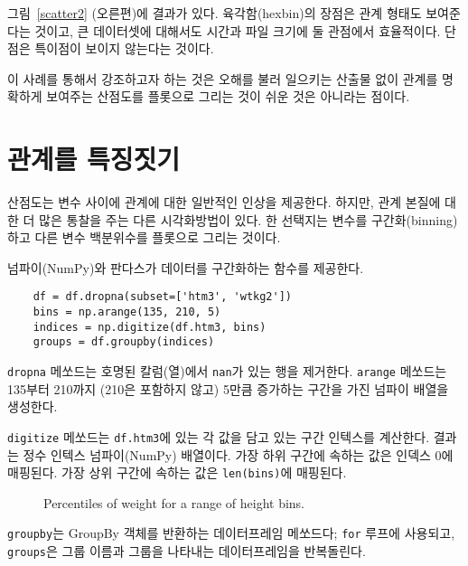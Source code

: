 그림~\ref{scatter2} (오른편)에 결과가 있다.
육각함(hexbin)의 장점은 관계 형태도 보여준다는 것이고,
큰 데이터셋에 대해서도 시간과 파일 크기에 둘 관점에서 효율적이다.
단점은 특이점이 보이지 않는다는 것이다.
 

이 사례를 통해서 강조하고자 하는 것은 오해를 불러 일으키는 산출물 없이 관계를 명확하게 보여주는 산점도를 플롯으로 그리는 것이 쉬운 것은 아니라는 점이다.



\section{관계를 특징짓기}
\label{characterizing}

산점도는 변수 사이에 관계에 대한 일반적인 인상을 제공한다. 하지만, 관계 본질에 대한 더 많은 통찰을 주는 
다른 시각화방법이 있다. 한 선택지는 변수를 구간화(binning)하고 다른 변수 백분위수를 플롯으로 그리는 것이다.


넘파이(NumPy)와 판다스가 데이터를 구간화하는 함수를 제공한다.

\begin{verbatim}
    df = df.dropna(subset=['htm3', 'wtkg2'])
    bins = np.arange(135, 210, 5)
    indices = np.digitize(df.htm3, bins)
    groups = df.groupby(indices)
\end{verbatim}

{\tt dropna} 메쏘드는 호명된 칼럼(열)에서 {\tt nan}가 있는 행을 제거한다. 
{\tt arange} 메쏘드는 135부터 210까지 (210은 포함하지 않고) 5만큼 증가하는 구간을 가진 넘파이 배열을 생성한다.


{\tt digitize} 메쏘드는 {\tt df.htm3}에 있는 각 값을 담고 있는 구간 인텍스를 계산한다.
결과는 정수 인텍스 넘파이(NumPy) 배열이다. 
가장 하위 구간에 속하는 값은 인덱스 0에 매핑된다. 가장 상위 구간에 속하는 값은 {\tt len(bins)}에 매핑된다.

\begin{figure}
\caption{Percentiles of weight for a range of height bins.}
\label{scatter3}
\end{figure}

{\tt groupby}는 GroupBy 객체를 반환하는 데이터프레임 메쏘드다;
{\tt for} 루프에 사용되고, {\tt groups}은 그룹 이름과 그룹을 나타내는 데이터프레임을 반복돌린다.

